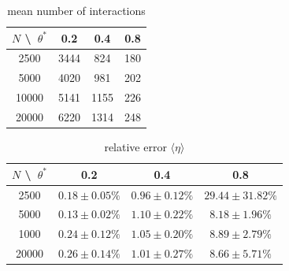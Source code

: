     \begin{table}[h!]
        \begin{center}
        \caption{mean number of interactions}
        \begin{tabular}{c | c | c | c}
            $N$ \textbackslash\ $\theta^*$ & 0.2  & 0.4  & 0.8 \\
            \hline
            2500  & 3444 & 824  & 180 \\
            \hline
            5000  & 4020 & 981  & 202 \\
            \hline
            10000 & 5141 & 1155 & 226 \\
            \hline
            20000 & 6220 & 1314 & 248 \\
        \end{tabular}
        \end{center}
    \end{table} 
    \begin{table}[h!]
        \begin{center}
            \caption{relative error $\langle\eta\rangle$}
            \begin{tabular}{c | c | c | c}
                $N$ \textbackslash\ $\theta^*$ & 0.2 & 0.4 & 0.8 \\
                \hline
                2500  & $0.18\pm0.05\%$ & $0.96\pm0.12\%$ & $29.44\pm31.82\%$ \\
                \hline
                5000  & $0.13\pm0.02\%$ & $1.10\pm0.22\%$ & $8.18\pm1.96\%$ \\
                \hline
                1000  & $0.24\pm0.12\%$ & $1.05\pm0.20\%$ & $8.89\pm2.79\%$ \\
                \hline
                20000 & $0.26\pm0.14\%$ & $1.01\pm0.27\%$ & $8.66\pm5.71\%$ \\
            \end{tabular}
        \end{center}
    \end{table} \ \\ 

\newpage
